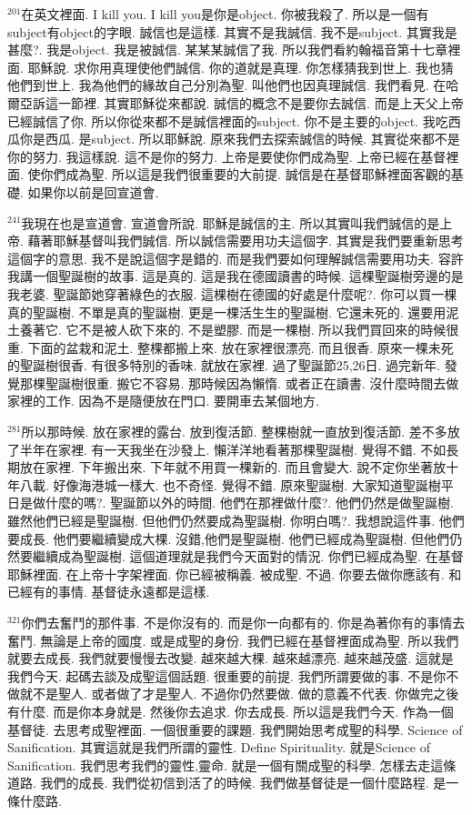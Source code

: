 \documentclass{book}
\begin{document}
$^{201}$在英文裡面.
I kill you.
I kill you是你是object.
你被我殺了.
所以是一個有subject有object的字眼.
誠信也是這樣.
其實不是我誠信.
我不是subject.
其實我是甚麼?.
我是object.
我是被誠信.
某某某誠信了我.
所以我們看約翰福音第十七章裡面.
耶穌說.
求你用真理使他們誠信.
你的道就是真理.
你怎樣猜我到世上.
我也猜他們到世上.
我為他們的緣故自己分別為聖.
叫他們也因真理誠信.
我們看見.
在哈爾亞訴這一節裡.
其實耶穌從來都說.
誠信的概念不是要你去誠信.
而是上天父上帝已經誠信了你.
所以你從來都不是誠信裡面的subject.
你不是主要的object.
我吃西瓜你是西瓜.
是subject.
所以耶穌說.
原來我們去探索誠信的時候.
其實從來都不是你的努力.
我這樣說.
這不是你的努力.
上帝是要使你們成為聖.
上帝已經在基督裡面.
使你們成為聖.
所以這是我們很重要的大前提.
誠信是在基督耶穌裡面客觀的基礎.
如果你以前是回宣道會.

$^{241}$我現在也是宣道會.
宣道會所說.
耶穌是誠信的主.
所以其實叫我們誠信的是上帝.
藉著耶穌基督叫我們誠信.
所以誠信需要用功夫這個字.
其實是我們要重新思考這個字的意思.
我不是說這個字是錯的.
而是我們要如何理解誠信需要用功夫.
容許我講一個聖誕樹的故事.
這是真的.
這是我在德國讀書的時候.
這棵聖誕樹旁邊的是我老婆.
聖誕節她穿著綠色的衣服.
這棵樹在德國的好處是什麼呢?.
你可以買一棵真的聖誕樹.
不單是真的聖誕樹.
更是一棵活生生的聖誕樹.
它還未死的.
還要用泥土養著它.
它不是被人砍下來的.
不是塑膠.
而是一棵樹.
所以我們買回來的時候很重.
下面的盆栽和泥土.
整棵都搬上來.
放在家裡很漂亮.
而且很香.
原來一棵未死的聖誕樹很香.
有很多特別的香味.
就放在家裡.
過了聖誕節25,26日.
過完新年.
發覺那棵聖誕樹很重.
搬它不容易.
那時候因為懶惰.
或者正在讀書.
沒什麼時間去做家裡的工作.
因為不是隨便放在門口.
要開車去某個地方.

$^{281}$所以那時候.
放在家裡的露台.
放到復活節.
整棵樹就一直放到復活節.
差不多放了半年在家裡.
有一天我坐在沙發上.
懶洋洋地看著那棵聖誕樹.
覺得不錯.
不如長期放在家裡.
下年搬出來.
下年就不用買一棵新的.
而且會變大.
說不定你坐著放十年八載.
好像海港城一樣大.
也不奇怪.
覺得不錯.
原來聖誕樹.
大家知道聖誕樹平日是做什麼的嗎?.
聖誕節以外的時間.
他們在那裡做什麼?.
他們仍然是做聖誕樹.
雖然他們已經是聖誕樹.
但他們仍然要成為聖誕樹.
你明白嗎?.
我想說這件事.
他們要成長.
他們要繼續變成大棵.
沒錯,他們是聖誕樹.
他們已經成為聖誕樹.
但他們仍然要繼續成為聖誕樹.
這個道理就是我們今天面對的情況.
你們已經成為聖.
在基督耶穌裡面.
在上帝十字架裡面.
你已經被稱義.
被成聖.
不過.
你要去做你應該有.
和已經有的事情.
基督徒永遠都是這樣.

$^{321}$你們去奮鬥的那件事.
不是你沒有的.
而是你一向都有的.
你是為著你有的事情去奮鬥.
無論是上帝的國度.
或是成聖的身份.
我們已經在基督裡面成為聖.
所以我們就要去成長.
我們就要慢慢去改變.
越來越大棵.
越來越漂亮.
越來越茂盛.
這就是我們今天.
起碼去談及成聖這個話題.
很重要的前提.
我們所謂要做的事.
不是你不做就不是聖人.
或者做了才是聖人.
不過你仍然要做.
做的意義不代表.
你做完之後有什麼.
而是你本身就是.
然後你去追求.
你去成長.
所以這是我們今天.
作為一個基督徒.
去思考成聖裡面.
一個很重要的課題.
我們開始思考成聖的科學.
Science of Sanification.
其實這就是我們所謂的靈性.
Define Spirituality.
就是Science of Sanification.
我們思考我們的靈性,靈命.
就是一個有關成聖的科學.
怎樣去走這條道路.
我們的成長.
我們從初信到活了的時候.
我們做基督徒是一個什麼路程.
是一條什麼路.
\end{document}
